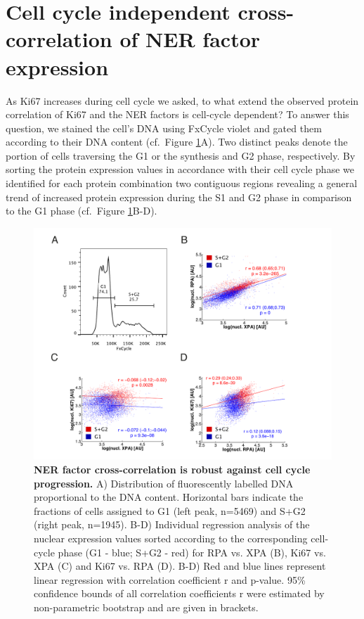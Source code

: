 \section {Cell cycle independent cross-correlation of NER factor expression}
As Ki67 increases during cell cycle we asked, to what extend the observed protein correlation of Ki67 and the NER factors is cell-cycle dependent? To answer this question, we stained the cell's DNA using FxCycle violet and gated them according to their DNA content (cf.\ Figure \ref{fig:FC_cell_cycle}A). Two distinct peaks denote the portion of cells traversing the G1 or the synthesis and G2 phase, respectively. By sorting the protein expression values in accordance with their cell cycle phase we identified for each protein combination two contiguous regions revealing a general trend of increased protein expression during the S1 and G2 phase in comparison to the G1 phase (cf.\ Figure \ref{fig:FC_cell_cycle}B-D).  

\begin{figure}[htbp]
	\begin{center}
		\includegraphics[width=1\textwidth]{Abbildungen/figureTAC_4.pdf}
		\caption{\textbf{NER factor cross-correlation is robust against cell cycle progression.} A) Distribution of fluorescently labelled DNA proportional to the DNA content. Horizontal bars indicate the fractions of cells assigned to G1 (left peak, n=5469) and S+G2 (right peak, n=1945).  B-D) Individual regression analysis of the nuclear expression values sorted according to the corresponding cell-cycle phase (G1 - blue; S+G2 - red) for RPA vs. XPA (B), Ki67 vs. XPA (C) and Ki67 vs. RPA (D). B-D) Red and blue lines represent linear regression with correlation coefficient r and p-value. 95\% confidence bounds of all correlation coefficients r were estimated by non-parametric bootstrap and are given in brackets.}
		\label{fig:FC_cell_cycle}
	\end{center}
\end{figure}


